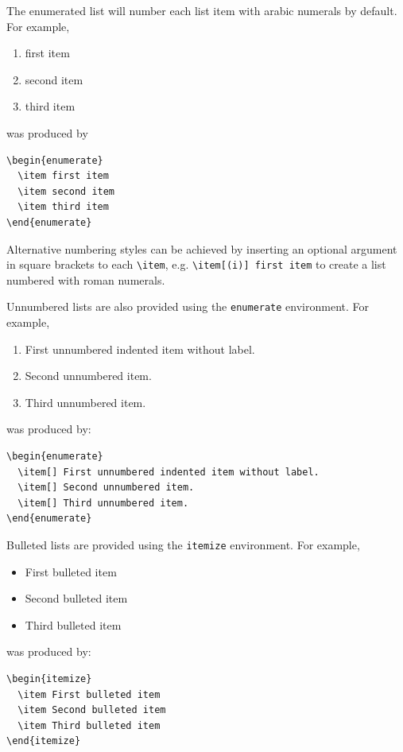\documentclass{gCMB2e}
\begin{document}
The enumerated list will number each list item with arabic numerals by default. For example,
%
\begin{enumerate}
  \item first item
  \item second item
  \item third item
\end{enumerate}
%
was produced by
%
\begin{verbatim}
\begin{enumerate}
  \item first item
  \item second item
  \item third item
\end{enumerate}
\end{verbatim}
%
Alternative numbering styles can be achieved by inserting an optional argument in square brackets to each \verb"\item", e.g. \verb"\item[(i)] first item" to create a list numbered with roman numerals.

Unnumbered lists are also provided using the {\tt enumerate} environment. For example,
%
\begin{enumerate}
  \item[] First unnumbered indented item without label.
  \item[] Second unnumbered item.
  \item[] Third unnumbered item.
\end{enumerate}
%
was produced by:
%
\begin{verbatim}
\begin{enumerate}
  \item[] First unnumbered indented item without label.
  \item[] Second unnumbered item.
  \item[] Third unnumbered item.
\end{enumerate}
\end{verbatim}

Bulleted lists are provided using the {\tt itemize} environment. For example,
%
\begin{itemize}
  \item First bulleted item
  \item Second bulleted item
  \item Third bulleted item
\end{itemize}
%
was produced by:
%
\begin{verbatim}
\begin{itemize}
  \item First bulleted item
  \item Second bulleted item
  \item Third bulleted item
\end{itemize}
\end{verbatim}
\end{document}
